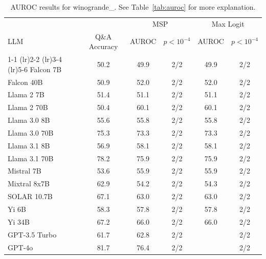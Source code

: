 \begin{table}[h]
\caption{AUROC results for winogrande_. See Table~\ref{tab:auroc} for more explanation.}
\label{tab:auroc_margin}
\centering
\begin{tabular}{lccccc}
\toprule
& & \multicolumn{2}{c}{MSP} & \multicolumn{2}{c}{Max Logit} \\ 
LLM & Q\&A Accuracy & AUROC & $p < 10^{-4}$ & AUROC & $p < 10^{-4}$ \\ 
\cmidrule(lr){1-1} \cmidrule(lr){2-2} \cmidrule(lr){3-4} \cmidrule(lr){5-6} 
Falcon 7B & 50.2 & 49.9 & 2/2 & 49.9 & 2/2\\
Falcon 40B & 50.9 & 52.0 & 2/2 & 52.0 & 2/2\\
Llama 2 7B & 51.4 & 51.1 & 2/2 & 51.1 & 2/2\\
Llama 2 70B & 50.4 & 60.1 & 2/2 & 60.1 & 2/2\\
Llama 3.0 8B & 55.6 & 55.8 & 2/2 & 55.8 & 2/2\\
Llama 3.0 70B & 75.3 & 73.3 & 2/2 & 73.3 & 2/2\\
Llama 3.1 8B & 56.9 & 58.1 & 2/2 & 58.1 & 2/2\\
Llama 3.1 70B & 78.2 & 75.9 & 2/2 & 75.9 & 2/2\\
Mistral 7B & 53.6 & 55.9 & 2/2 & 55.9 & 2/2\\
Mixtral 8x7B & 62.9 & 54.2 & 2/2 & 54.3 & 2/2\\
SOLAR 10.7B & 67.1 & 63.0 & 2/2 & 63.0 & 2/2\\
Yi 6B & 58.3 & 57.8 & 2/2 & 57.8 & 2/2\\
Yi 34B & 67.2 & 66.0 & 2/2 & 66.0 & 2/2\\
GPT-3.5 Turbo & 61.7 & 62.8 & 2/2 &  & 2/2\\
GPT-4o & 81.7 & 76.4 & 2/2 &  & 2/2\\
\bottomrule
\end{tabular}
\end{table}
